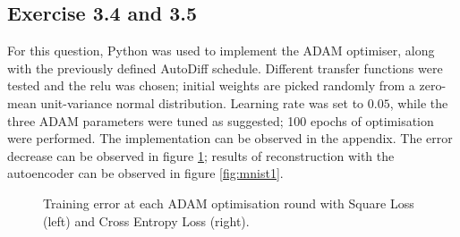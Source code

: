 \documentclass[fleqn]{article}
\begin{document}
\subsection*{Exercise 3.4 and 3.5}
For this question, Python was used to implement the ADAM optimiser, along with the previously defined AutoDiff schedule. Different transfer functions were tested and the relu was chosen; initial weights are picked randomly from a zero-mean unit-variance normal distribution. Learning rate was set to $0.05$, while the three ADAM parameters were tuned as suggested; 100 epochs of optimisation were performed. The implementation can be observed in the appendix. The error decrease can be observed in figure \ref{fig:loss}; results of reconstruction with the autoencoder can be observed in figure \ref{fig:mnist1}.
\begin{figure}[H]
    \centering
    \qquad
    \caption{Training error at each ADAM optimisation round with Square Loss (left) and Cross Entropy Loss (right).}
    \label{fig:loss}
\end{figure}
\end{document}

